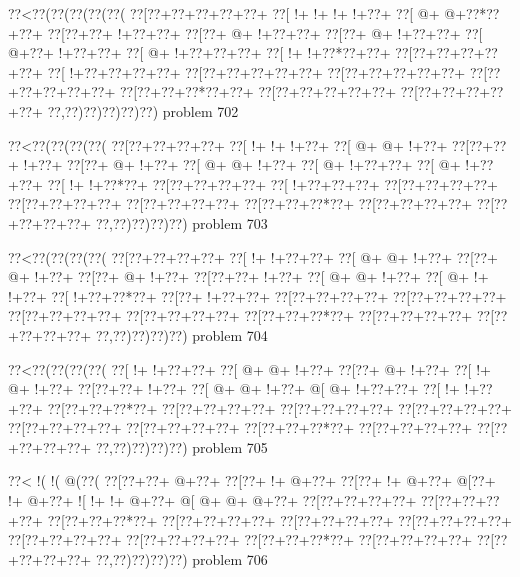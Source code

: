 \vbox{\vbox{\goo
\0??<\0??(\0??(\0??(\0??(\0??(
\0??[\0??+\0??+\0??+\0??+\0??+
\0??[\- !+\- !+\- !+\- !+\0??+
\0??[\- @+\- @+\0??*\0??+\0??+
\0??[\0??+\0??+\- !+\0??+\0??+
\0??[\0??+\- @+\- !+\0??+\0??+
\0??[\0??+\- @+\- !+\0??+\0??+
\0??[\- @+\0??+\- !+\0??+\0??+
\0??[\- @+\- !+\0??+\0??+\0??+
\0??[\- !+\- !+\0??*\0??+\0??+
\0??[\0??+\0??+\0??+\0??+\0??+
\0??[\- !+\0??+\0??+\0??+\0??+
\0??[\0??+\0??+\0??+\0??+\0??+
\0??[\0??+\0??+\0??+\0??+\0??+
\0??[\0??+\0??+\0??+\0??+\0??+
\0??[\0??+\0??+\0??*\0??+\0??+
\0??[\0??+\0??+\0??+\0??+\0??+
\0??[\0??+\0??+\0??+\0??+\0??+
\0??,\0??)\0??)\0??)\0??)\0??)
}
\hfil problem 702\hfil\break
}

\vbox{\vbox{\goo
\0??<\0??(\0??(\0??(\0??(
\0??[\0??+\0??+\0??+\0??+
\0??[\- !+\- !+\- !+\0??+
\0??[\- @+\- @+\- !+\0??+
\0??[\0??+\0??+\- !+\0??+
\0??[\0??+\- @+\- !+\0??+
\0??[\- @+\- @+\- !+\0??+
\0??[\- @+\- !+\0??+\0??+
\0??[\- @+\- !+\0??+\0??+
\0??[\- !+\- !+\0??*\0??+
\0??[\0??+\0??+\0??+\0??+
\0??[\- !+\0??+\0??+\0??+
\0??[\0??+\0??+\0??+\0??+
\0??[\0??+\0??+\0??+\0??+
\0??[\0??+\0??+\0??+\0??+
\0??[\0??+\0??+\0??*\0??+
\0??[\0??+\0??+\0??+\0??+
\0??[\0??+\0??+\0??+\0??+
\0??,\0??)\0??)\0??)\0??)
}
\hfil problem 703\hfil\break
}

\vbox{\vbox{\goo
\0??<\0??(\0??(\0??(\0??(
\0??[\0??+\0??+\0??+\0??+
\0??[\- !+\- !+\0??+\0??+
\0??[\- @+\- @+\- !+\0??+
\0??[\0??+\- @+\- !+\0??+
\0??[\0??+\- @+\- !+\0??+
\0??[\0??+\0??+\- !+\0??+
\0??[\- @+\- @+\- !+\0??+
\0??[\- @+\- !+\- !+\0??+
\0??[\- !+\0??+\0??*\0??+
\0??[\0??+\- !+\0??+\0??+
\0??[\0??+\0??+\0??+\0??+
\0??[\0??+\0??+\0??+\0??+
\0??[\0??+\0??+\0??+\0??+
\0??[\0??+\0??+\0??+\0??+
\0??[\0??+\0??+\0??*\0??+
\0??[\0??+\0??+\0??+\0??+
\0??[\0??+\0??+\0??+\0??+
\0??,\0??)\0??)\0??)\0??)
}
\hfil problem 704\hfil\break
}

\vbox{\vbox{\goo
\0??<\0??(\0??(\0??(\0??(
\0??[\- !+\- !+\0??+\0??+
\0??[\- @+\- @+\- !+\0??+
\0??[\0??+\- @+\- !+\0??+
\0??[\- !+\- @+\- !+\0??+
\0??[\0??+\0??+\- !+\0??+
\0??[\- @+\- @+\- !+\0??+
\- @[\- @+\- !+\0??+\0??+
\0??[\- !+\- !+\0??+\0??+
\0??[\0??+\0??+\0??*\0??+
\0??[\0??+\0??+\0??+\0??+
\0??[\0??+\0??+\0??+\0??+
\0??[\0??+\0??+\0??+\0??+
\0??[\0??+\0??+\0??+\0??+
\0??[\0??+\0??+\0??+\0??+
\0??[\0??+\0??+\0??*\0??+
\0??[\0??+\0??+\0??+\0??+
\0??[\0??+\0??+\0??+\0??+
\0??,\0??)\0??)\0??)\0??)
}
\hfil problem 705\hfil\break
}

\vbox{\vbox{\goo
\0??<\- !(\- !(\- @(\0??(
\0??[\0??+\0??+\- @+\0??+
\0??[\0??+\- !+\- @+\0??+
\0??[\0??+\- !+\- @+\0??+
\- @[\0??+\- !+\- @+\0??+
\- ![\- !+\- !+\- @+\0??+
\- @[\- @+\- @+\- @+\0??+
\0??[\0??+\0??+\0??+\0??+
\0??[\0??+\0??+\0??+\0??+
\0??[\0??+\0??+\0??*\0??+
\0??[\0??+\0??+\0??+\0??+
\0??[\0??+\0??+\0??+\0??+
\0??[\0??+\0??+\0??+\0??+
\0??[\0??+\0??+\0??+\0??+
\0??[\0??+\0??+\0??+\0??+
\0??[\0??+\0??+\0??*\0??+
\0??[\0??+\0??+\0??+\0??+
\0??[\0??+\0??+\0??+\0??+
\0??,\0??)\0??)\0??)\0??)
}
\hfil problem 706\hfil\break
}

